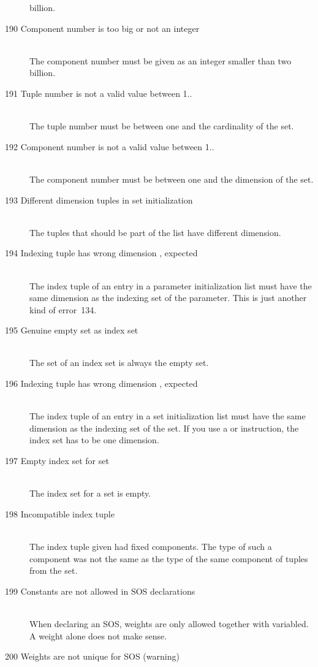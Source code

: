 \begin{description}
  billion.
\item[190 Component number \code{xxx} is too big or not an integer]\ \\
  The component number must be given as an integer smaller than two
  billion.
\item[191 Tuple number \code{xxx} is not a valid value between 1..\code{yyy}]\ \\
  The tuple number must be between one and the cardinality of the set.
\item[192 Component number \code{xxx} is not a valid value between 1..\code{yyy}]\ \\
  The component number must be between one and the dimension of the set.
\item[193 Different dimension tuples in set initialization]\ \\
  The tuples that should be part of the list have different dimension.
\item[194 Indexing tuple \code{xxx} has wrong dimension
           \code{yyy}, expected \code{zzz}]\ \\
  The index tuple of an entry in a parameter initialization list must
  have the same dimension as the indexing set of the parameter. This
  is just another kind of error~134.
\item[195 Genuine empty set as index set]\ \\
  The set of an index set is always the empty set.
\item[196 Indexing tuple \code{xxx} has wrong dimension
           \code{yyy}, expected \code{zzz}]\ \\
  The index tuple of an entry in a set initialization list must
  have the same dimension as the indexing set of the set. 
  If you use a  or  instruction, the index
  set has to be one dimension.
\item[197 Empty index set for set]\ \\
  The index set for a set is empty.
\item[198 Incompatible index tuple]\ \\
  The index tuple given had fixed components. The type of such a
  component was not the same as the type of the same component of tuples
  from the set.
\item[199 Constants are not allowed in SOS declarations]\ \\
  When declaring an SOS, weights are only allowed together with
  variabled. A weight alone does not make sense.
\item[200 Weights are not unique for SOS \code{xxx} (warning)]\ \\

\end{description}
